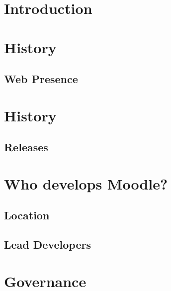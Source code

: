 \documentclass{article}
\begin{document}
\section{Introduction} %
\label{sec:introduction}


\section{History} %
\label{sec:history}

\subsection{Web Presence} %
\label{sub:web_presence}


\section{History} %
\label{sec:history}

\subsection{Releases} %
\label{sub:releases}



\section{Who develops Moodle?} %
\label{sec:who_develops_moodle_}

\subsection{Location} %
\label{sub:location}


\subsection{Lead Developers} %
\label{sub:lead_developers}


\section{Governance} %
\label{sec:governance}
\end{document}
